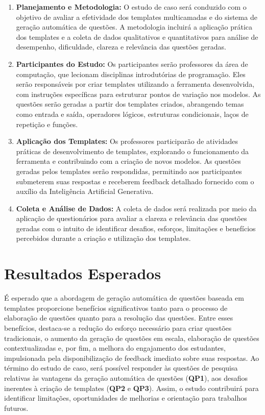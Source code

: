 \begin{enumerate}[label=\textbf{\alph*)}]
    \item \textbf{Planejamento e Metodologia:}  
    O estudo de caso será conduzido com o objetivo de avaliar a efetividade dos templates multicamadas e do sistema de geração automática de questões. A metodologia incluirá a aplicação prática dos templates e a coleta de dados qualitativos e quantitativos para análise de desempenho, dificuldade, clareza e relevância das questões geradas. 

    \item \textbf{Participantes do Estudo:}  
    Os participantes serão professores da área de computação, que lecionam disciplinas introdutórias de programação. Eles serão responsáveis por criar templates utilizando a ferramenta desenvolvida, com instruções específicas para estruturar pontos de variação nos modelos. As questões serão geradas a partir dos templates criados, abrangendo temas como entrada e saída, operadores lógicos, estruturas condicionais, laços de repetição e funções.

    \item \textbf{Aplicação dos Templates:}  
    Os professores participarão de atividades práticas de desenvolvimento de templates, explorando o funcionamento da ferramenta e contribuindo com a criação de novos modelos. As questões geradas pelos templates serão respondidas, permitindo aos participantes submeterem suas respostas e receberem feedback detalhado fornecido com o auxílio da Inteligência Artificial Generativa.

    \item \textbf{Coleta e Análise de Dados:}  A coleta de dados será realizada por meio da aplicação de questionários para avaliar a clareza e relevância das questões geradas com o intuito de identificar desafios, esforços, limitações e benefícios percebidos durante a criação e utilização dos templates. 
\end{enumerate}
    


\section{Resultados Esperados}

É esperado que a abordagem de geração automática de questões baseada em templates  proporcione benefícios significativos tanto para o processo de elaboração de questões quanto para a resolução das questões. Entre esses benefícios,  destaca-se a redução do esforço necessário para criar questões tradicionais, o aumento da geração de questões em escala, elaboração de questões contextualizadas e, por fim, a melhora do engajamento dos estudantes, impulsionada pela disponibilização de feedback imediato sobre suas respostas. Ao término do estudo de caso, será possível responder às questões de pesquisa relativas às vantagens da geração automática de questões (\textbf{QP1}), aos desafios inerentes à criação de templates (\textbf{QP2} e \textbf{QP3}). Assim, o estudo contribuirá para identificar limitações, oportunidades de melhorias e orientação para trabalhos futuros.



